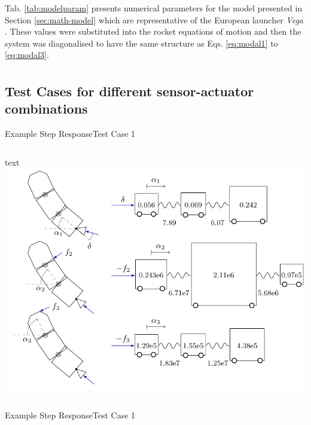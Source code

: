 \documentclass{beamer}
\begin{document}
\begin{frame}
Tab. \ref{tab:modelparam} presents numerical parameters for the model presented in Section \ref{sec:math-model} which are representative of the European launcher \emph{Vega} \cite{Perez2006}.
These values were substituted into the rocket equations of motion and then the system was diagonalised to have the same structure as Eqs. \ref{eq:modal1} to \ref{eq:modal3}.
\begin{multline}

\label{eq:num_rock1}
\end{multline}
\begin{equation}

\label{eq:num_rock2}
\end{equation}
\end{frame}

\subsection{Test Cases for different sensor-actuator combinations}

\begin{frame}{Example Step Response}{Test Case 1}
\begin{columns}
text
    \includegraphics[width=\textwidth]{graphics/rocket-trans-pres.pdf}
\end{columns}
\end{frame}

\begin{frame}{Example Step Response}{Test Case 1}
\begin{center}
    
\end{center}
\end{frame}
\end{document}
